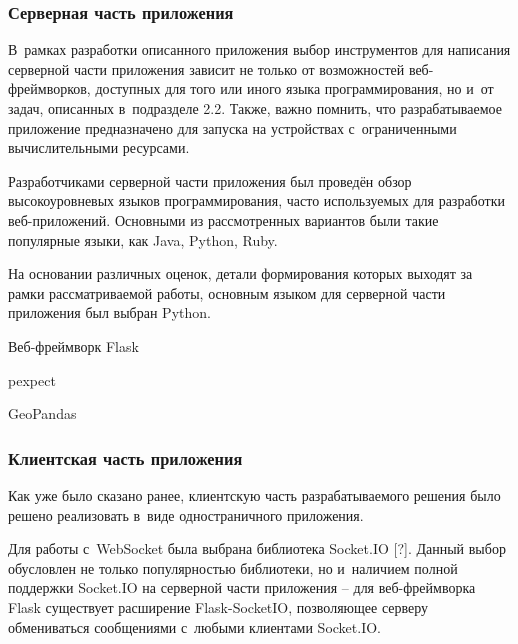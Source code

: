\subsubsection{Серверная часть приложения}
\label{subsec:backend-tools}

В~рамках разработки описанного приложения выбор инструментов для написания серверной части приложения зависит не только от возможностей веб-фреймворков, доступных для того или иного языка программирования, но и~от задач, описанных в~подразделе 2.2. Также, важно помнить, что разрабатываемое приложение предназначено для запуска на устройствах с~ограниченными вычислительными ресурсами. \par

Разработчиками серверной части приложения был проведён обзор высокоуровневых языков программирования, часто используемых для разработки веб-приложений. Основными из рассмотренных вариантов были такие популярные языки, как Java, Python, Ruby. \par

На основании различных оценок, детали формирования которых выходят за рамки рассматриваемой работы, основным языком для серверной части приложения был выбран Python.

\begin{dashitemize}
  \item Веб-фреймворк Flask
  \item pexpect
  \item GeoPandas
\end{dashitemize}

\subsubsection{Клиентская часть приложения}
\label{subsec:frontend-tools}

Как уже было сказано ранее, клиентскую часть разрабатываемого решения было решено реализовать в~виде одностраничного приложения. \par

Для работы с~WebSocket была выбрана библиотека Socket.IO [?]. Данный выбор обусловлен не только популярностью библиотеки, но и~наличием полной поддержки Socket.IO на серверной части приложения -- для веб-фреймворка Flask существует расширение Flask-SocketIO, позволяющее серверу обмениваться сообщениями с~любыми клиентами Socket.IO.

